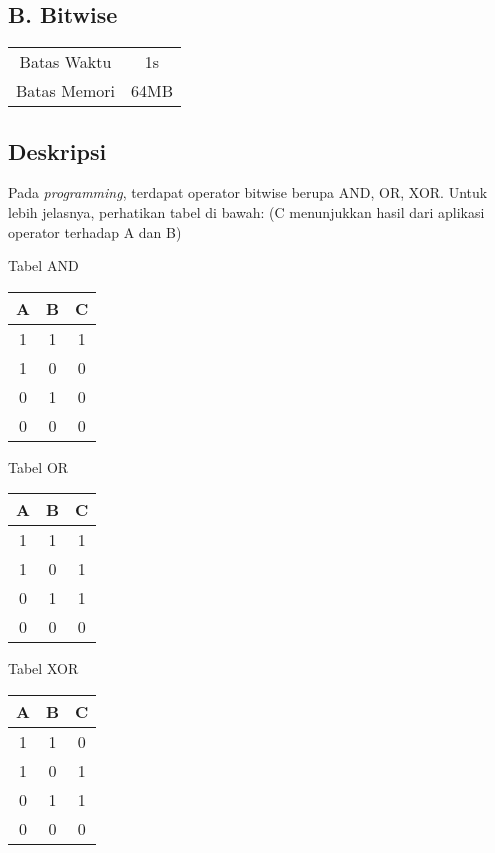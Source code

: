 \documentclass{article}
\begin{document}
\begin{center}
    \section*{B. Bitwise} %

    \begin{tabular}{ | c c | }
        \hline
        Batas Waktu  & 1s \\    %
        Batas Memori & 64MB \\  %
        \hline
    \end{tabular}
\end{center}

\subsection*{Deskripsi}

Pada \textit{programming}, terdapat operator bitwise berupa AND, OR, XOR.
Untuk lebih jelasnya, perhatikan tabel di bawah: (C menunjukkan hasil dari aplikasi operator terhadap A dan B)

\begin{multicols}{3}
    Tabel AND

    \begin{tabular} { | c c | c | }
        \hline
        A & B & C \\
        \hline
        1 & 1 & 1 \\
        1 & 0 & 0 \\
        0 & 1 & 0 \\
        0 & 0 & 0 \\
        \hline
    \end{tabular}

    Tabel OR

    \begin{tabular} { | c c | c | }
        \hline
        A & B & C \\
        \hline
        1 & 1 & 1 \\
        1 & 0 & 1 \\
        0 & 1 & 1 \\
        0 & 0 & 0 \\
        \hline
    \end{tabular}

    Tabel XOR

    \begin{tabular} { | c c | c | }
        \hline
        A & B & C \\
        \hline
        1 & 1 & 0 \\
        1 & 0 & 1 \\
        0 & 1 & 1 \\
        0 & 0 & 0 \\
        \hline
    \end{tabular}
\end{multicols}
\end{document}
